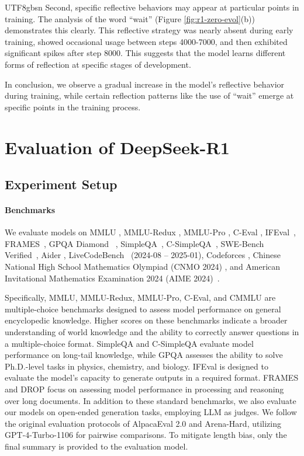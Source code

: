 \documentclass[11pt, a4paper, logo, copyright, nonumbering]{deepseek}
\newcommand{\dsri}{DeepSeek-R1}
\begin{document}
\begin{CJK*}{UTF8}{gbsn}
Second, specific reflective behaviors may appear at particular points in training. The analysis of the word ``wait'' (Figure \ref{fig:r1-zero-evol}(b)) demonstrates this clearly. This reflective strategy was nearly absent during early training, showed occasional usage between steps 4000-7000, and then exhibited significant spikes after step 8000. This suggests that the model learns different forms of reflection at specific stages of development.

In conclusion, we observe a gradual increase in the model's reflective behavior during training, while certain reflection patterns like the use of ``wait'' emerge at specific points in the training process.

\section{Evaluation of \dsri{}}\label{sec:eval}
\subsection{Experiment Setup}

\paragraph{Benchmarks} We evaluate models on MMLU \citep{mmlu}, MMLU-Redux \citep{mmlu_redux}, MMLU-Pro \citep{mmlu_pro}, C-Eval \citep{ceval},  IFEval~\citep{IFeval}, FRAMES~\citep{frames}, GPQA Diamond ~\citep{gpqa}, SimpleQA~\citep{simpleqa}, C-SimpleQA~\citep{csimpleqa}, SWE-Bench Verified~\citep{swe_verified}, Aider \citep{aider}, LiveCodeBench~\citep{livecodebench} (2024-08 -- 2025-01), Codeforces \citep{codeforces}, Chinese National High School Mathematics Olympiad (CNMO 2024) \citep{cnmo}, and American Invitational Mathematics Examination 2024 (AIME 2024)~\citep{AIME2024}. 

Specifically, MMLU, MMLU-Redux, MMLU-Pro, C-Eval, and CMMLU are multiple-choice benchmarks designed to assess model performance on general encyclopedic knowledge. Higher scores on these benchmarks indicate a broader understanding of world knowledge and the ability to correctly answer questions in a multiple-choice format. SimpleQA and C-SimpleQA evaluate model performance on long-tail knowledge, while GPQA assesses the ability to solve Ph.D.-level tasks in physics, chemistry, and biology. IFEval is designed to evaluate the model’s capacity to generate outputs in a required format. FRAMES and DROP focus on assessing model performance in processing and reasoning over long documents. In addition to these standard benchmarks, we also evaluate our models on open-ended generation tasks, employing LLM as judges. We follow the original evaluation protocols of AlpacaEval 2.0 and Arena-Hard, utilizing GPT-4-Turbo-1106 for pairwise comparisons. To mitigate length bias, only the final summary is provided to the evaluation model.


\end{CJK*}
\end{document}

